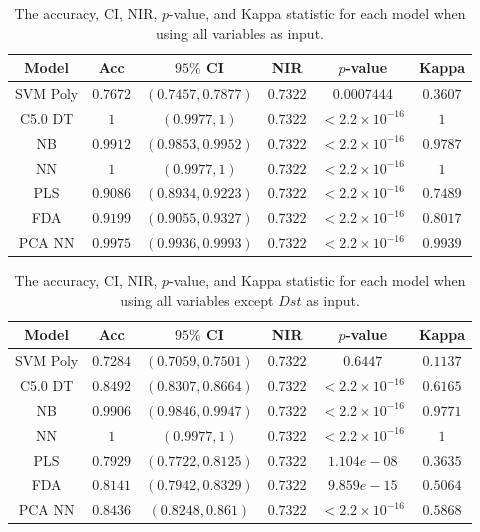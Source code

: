 \documentclass[sn-mathphys-num]{sn-jnl}%
\begin{document}
\begin{table}[!ht]
    \centering
    \caption{The accuracy, CI, NIR, $p$-value, and Kappa statistic for each model when using all variables as input.}
	\label{tab:stats:reverse:all}
	\begin{tabular}{|c|c|c|c|c|c|}
		\hline
		Model & Acc & $95\%$ CI & NIR & $p$-value & Kappa \\ \hline
		SVM Poly & $0.7672$ & $(0.7457, 0.7877)$ & $0.7322$ & $0.0007444$ & $0.3607$ \\ \hline
		C5.0 DT & $1$ & $(0.9977, 1)$ & $0.7322$ & $< 2.2 \times {10}^{-16}$ & $1$ \\ \hline
		NB & $0.9912$ & $(0.9853, 0.9952)$ & $0.7322$ & $< 2.2 \times {10}^{-16}$ & $0.9787$ \\ \hline
		NN & $1$ & $(0.9977, 1)$ & $0.7322$ & $< 2.2 \times {10}^{-16}$ & $1$ \\ \hline
		PLS & $0.9086$ & $(0.8934, 0.9223)$ & $0.7322$ & $< 2.2 \times {10}^{-16}$ & $0.7489$ \\ \hline
		FDA & $0.9199$ & $(0.9055, 0.9327)$ & $0.7322$ & $< 2.2 \times {10}^{-16}$ & $0.8017$ \\ \hline
		PCA NN & $0.9975$ & $(0.9936, 0.9993)$ & $0.7322$ & $< 2.2 \times {10}^{-16}$ & $0.9939$ \\ \hline
	\end{tabular}
\end{table}

\begin{table}[!ht]
    \centering
    \caption{The accuracy, CI, NIR, $p$-value, and Kappa statistic for each model when using all variables except $Dst$ as input.}
	\label{tab:stats:reverse:no_DisturbanceStormTime}
	\begin{tabular}{|c|c|c|c|c|c|}
		\hline
		Model & Acc & $95\%$ CI & NIR & $p$-value & Kappa \\ \hline
		SVM Poly & $0.7284$ & $(0.7059, 0.7501)$ & $0.7322$ & $0.6447$ & $0.1137$ \\ \hline
		C5.0 DT & $0.8492$ & $(0.8307, 0.8664)$ & $0.7322$ & $< 2.2 \times {10}^{-16}$ & $0.6165$ \\ \hline
		NB & $0.9906$ & $(0.9846, 0.9947)$ & $0.7322$ & $< 2.2 \times {10}^{-16}$ & $0.9771$ \\ \hline
		NN & $1$ & $(0.9977, 1)$ & $0.7322$ & $< 2.2 \times {10}^{-16}$ & $1$ \\ \hline
		PLS & $0.7929$ & $(0.7722, 0.8125)$ & $0.7322$ & $1.104e-08$ & $0.3635$ \\ \hline
		FDA & $0.8141$ & $(0.7942, 0.8329)$ & $0.7322$ & $9.859e-15$ & $0.5064$ \\ \hline
		PCA NN & $0.8436$ & $(0.8248, 0.861)$ & $0.7322$ & $< 2.2 \times {10}^{-16}$ & $0.5868$ \\ \hline
	\end{tabular}
\end{table}
\end{document}

